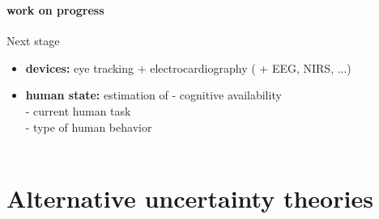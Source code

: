 \documentclass[12pt,svgnames,table]{beamer}
\begin{document}
\begin{frame}
\frametitle{\insertsection}
\framesubtitle{\footnotesize work on progress}
\begin{alertblock}{Next stage}
\begin{itemize}
\item \textbf{devices:} eye tracking + electrocardiography ( + EEG, NIRS, ...)\\
\item \textbf{human state:} {\color{DodgerBlue!70} estimation } of - cognitive availability \\
\hspace{5cm} - current human task \\
\hspace{5cm} - type of human behavior \\
\hspace{8cm} \cite{Nikolaidis:2015:EML:2696454.2696455}\\
\end{itemize}
\end{alertblock}
\end{frame}



\section[uncertainty theories]{Alternative uncertainty theories}
\end{document}
